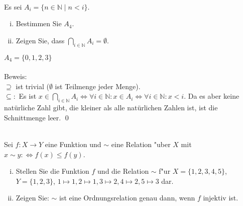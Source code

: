\\
Es sei $A_i=\{n\in\mathbb{N}\mid n<i\}$.
\begin{enumerate}[(i)]
    \item Bestimmen Sie $A_4$.
    \item Zeigen Sie, dass $\bigcap_{i\in\mathbb{N}}A_i=\emptyset$.
\end{enumerate}

\begin{loesung}

$A_4=\{0,1,2,3\}$\\
\vspace{0.3cm}\\
Beweis:\\
$\supseteq$ ist trivial ($\emptyset$ ist Teilmenge jeder Menge).\\
$\subseteq:$ Es ist $x\in\bigcap_{i\in\mathbb{N}}A_i \Leftrightarrow \forall i\in\mathbb{N}: x\in A_i \Leftrightarrow \forall i\in\mathbb{N}: x<i$. Da es aber keine natürliche Zahl gibt, die kleiner als alle natürlichen Zahlen ist, ist die Schnittmenge leer.
\qed
\end{loesung}

\\
Sei $f:X\to Y$ eine Funktion und $\sim$ eine Relation "uber $X$ mit $x\sim y:\Leftrightarrow f(x)\leq f(y)$.
\begin{enumerate}[(i)]
    \item Stellen Sie die Funktion $f$ und die Relation $\sim$ f"ur $X=\{1,2,3,4,5\}$, $Y=\{1,2,3\}$, $1\mapsto 1, 2\mapsto 1, 3\mapsto 2, 4\mapsto 2, 5\mapsto 3$ dar.
    \item Zeigen Sie: $\sim$ ist eine Ordnungsrelation genau dann, wenn $f$ injektiv ist.
\end{enumerate}

